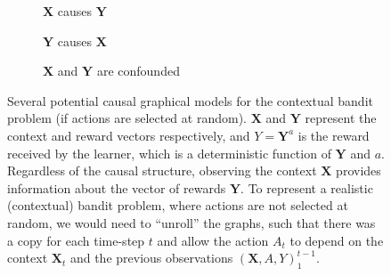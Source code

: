 \documentclass[11pt,a4paper,oneside]{book}
\renewcommand{\vec}[1]{\boldsymbol{#1}}
\newcommand{\quotes}[1]{``#1''}
\theoremstyle{plain}
\theoremstyle{definition}
\begin{document}
\begin{figure}[h]
\centering
\begin{subfigure}[t]{0.29\textwidth}
\centering
\caption{$\vec{X}$ causes $\vec{Y}$}
\label{fig:context-graph-causal}
\end{subfigure}
\begin{subfigure}[t]{0.29\textwidth}
\centering
\caption{$\vec{Y}$ causes $\vec{X}$}
\label{fig:context-graph-anti-causal}
\end{subfigure}
\begin{subfigure}[t]{0.29\textwidth}
\centering
\caption{$\vec{X}$ and $\vec{Y}$ are confounded}
\label{fig:context-graph-confounded}
\end{subfigure}
\caption{Several potential causal graphical models for the contextual bandit problem (if actions are selected at random). $\vec{X}$ and $\vec{Y}$ represent the context and reward vectors respectively, and $Y = \vec{Y}^a$ is the reward received by the learner, which is a deterministic function of $\vec{Y}$ and $a$. Regardless of the causal structure, observing the context $\vec{X}$ provides information about the vector of rewards $\vec{Y}$. To represent a realistic (contextual) bandit problem, where actions are not selected at random, we would need to \quotes{unroll} the graphs, such that there was a copy for each time-step $t$ and allow the action $A_t$ to depend on the context $\vec{X}_t$ and the previous observations $(\vec{X},A,Y)_1^{t-1}$. }
\label{fig:contextual-bandit-causal-graph}
\end{figure}
\end{document}
